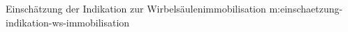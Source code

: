{Einschätzung der Indikation zur Wirbelsäulenimmobilisation}
{m:einschaetzung-indikation-ws-immobilisation}
{%
}{}
% 
% 
% 

